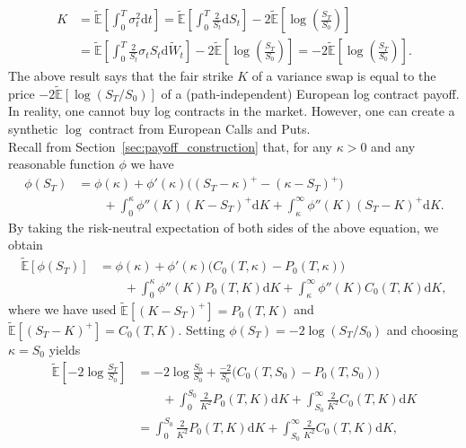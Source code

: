 \documentclass[12pt]{book}
\numberwithin{equation}{chapter}
\theoremstyle{plain}
\numberwithin{theorem}{section}
\theoremstyle{definition}
\numberwithin{exercise}{chapter}
\newcommand{\<}{\langle}
\renewcommand{\>}{\rangle}
\renewcommand{\(}{\left(}
\renewcommand{\)}{\right)}
\renewcommand{\[}{\left[}
\renewcommand{\]}{\right]}
\newcommand\Eb{\mathds{E}}
\newcommand\Ebt{\widetilde{\Eb}}
\newcommand\Wt{\widetilde{W}}
\newcommand\dd{\mathrm{d}}
\theoremstyle{definition}
\numberwithin{question}{section}
\begin{document}
\begin{align}
K
	&=	\Ebt \[ \int_0^T \sigma_t^2 \dd t \]  
	 = \Ebt \[ \int_0^T \frac{2}{S_t}\dd S_t \] - 2 \Ebt \[ \log \(\frac{S_T}{S_0}\) \] \\
	&= \Ebt \[ \int_0^T \frac{2}{S_t} \sigma_t S_t \dd \Wt_t \] - 2 \Ebt \[ \log \(\frac{S_T}{S_0}\) \]  
	 =  - 2 \Ebt \[ \log \(\frac{S_T}{S_0}\) \] .
\end{align}
The above result says that the fair strike $K$ of a variance swap is equal to the price $- 2 \Ebt \[ \log \(S_T/S_0\) \]$ of a (path-independent) European log contract payoff.   In reality, one cannot buy log contracts in the market.  However, one can create a synthetic $\log$ contract from European Calls and Puts.
\\[0.5em]
Recall from Section~\ref{sec:payoff_construction} that, for any $\kappa > 0$ and any reasonable function $\phi$ we have
\begin{align}
\phi(S_T)
	&=	\phi(\kappa) + \phi'(\kappa) \Big( (S_T-\kappa)^+ - (\kappa - S_T)^+ \Big) \\ &\qquad
			+ \int_0^\kappa \phi''(K) (K-S_T)^+ \dd K + \int_\kappa^\infty \phi''(K) (S_T-K)^+ \dd K .
\end{align}
By taking the risk-neutral expectation of both sides of the above equation, we obtain
\begin{align}
\Ebt \[ \phi(S_T) \]
	&=	\phi(\kappa) + \phi'(\kappa) \Big( C_0(T,\kappa) - P_0(T,\kappa) \Big) \\ &\qquad
			+ \int_0^\kappa \phi''(K) P_0(T,K) \dd K + \int_\kappa^\infty \phi''(K) C_0(T,K) \dd K, 
\end{align}
where we have used $\Ebt[(K-S_T)^+] = P_0(T,K)$ and $\Ebt[(S_T-K)^+] = C_0(T,K)$.
Setting $\phi(S_T) = -2 \log( S_T/S_0)$ and choosing $\kappa = S_0$ yields
\begin{align}
\Ebt \[ - 2 \log \frac{S_T}{S_0} \]
	&=	-2 \log  \frac{S_0}{S_0} + \frac{-2}{S_0} \Big( C_0(T,S_0) - P_0(T,S_0) \Big) \\ &\qquad
			+ \int_0^{S_0} \frac{2}{K^2} P_0(T,K) \dd K + \int_{S_0}^\infty \frac{2}{K^2} C_0(T,K) \dd K \\
	&=	\int_0^{S_0} \frac{2}{K^2} P_0(T,K) \dd K + \int_{S_0}^\infty \frac{2}{K^2} C_0(T,K) \dd K , \label{eq:9}
\end{align}
\end{document}
